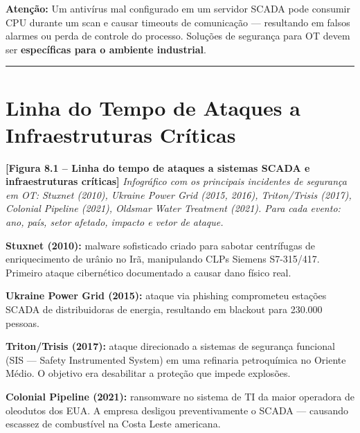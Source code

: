 \begin{caixaatencao}

\textbf{Atenção:} Um antivírus mal configurado em um servidor SCADA pode consumir CPU durante um scan e causar timeouts de comunicação --- resultando em falsos alarmes ou perda de controle do processo. Soluções de segurança para OT devem ser \textbf{específicas para o ambiente industrial}.

\end{caixaatencao}

\begin{center}\rule{0.5\linewidth}{0.5pt}\end{center}

\section{Linha do Tempo de Ataques a Infraestruturas Críticas}\label{linha-do-tempo-de-ataques-a-infraestruturas-cruxedticas}

\begin{caixafigura}

\textbf{{[}Figura 8.1 -- Linha do tempo de ataques a sistemas SCADA e infraestruturas críticas{]}}
\emph{Infográfico com os principais incidentes de segurança em OT: Stuxnet (2010), Ukraine Power Grid (2015, 2016), Triton/Trisis (2017), Colonial Pipeline (2021), Oldsmar Water Treatment (2021). Para cada evento: ano, país, setor afetado, impacto e vetor de ataque.}

\end{caixafigura}

\textbf{Stuxnet (2010):} malware sofisticado criado para sabotar centrífugas de enriquecimento de urânio no Irã, manipulando CLPs Siemens S7-315/417. Primeiro ataque cibernético documentado a causar dano físico real.

\textbf{Ukraine Power Grid (2015):} ataque via phishing comprometeu estações SCADA de distribuidoras de energia, resultando em blackout para 230.000 pessoas.

\textbf{Triton/Trisis (2017):} ataque direcionado a sistemas de segurança funcional (SIS --- Safety Instrumented System) em uma refinaria petroquímica no Oriente Médio. O objetivo era desabilitar a proteção que impede explosões.

\textbf{Colonial Pipeline (2021):} ransomware no sistema de TI da maior operadora de oleodutos dos EUA. A empresa desligou preventivamente o SCADA --- causando escassez de combustível na Costa Leste americana.

